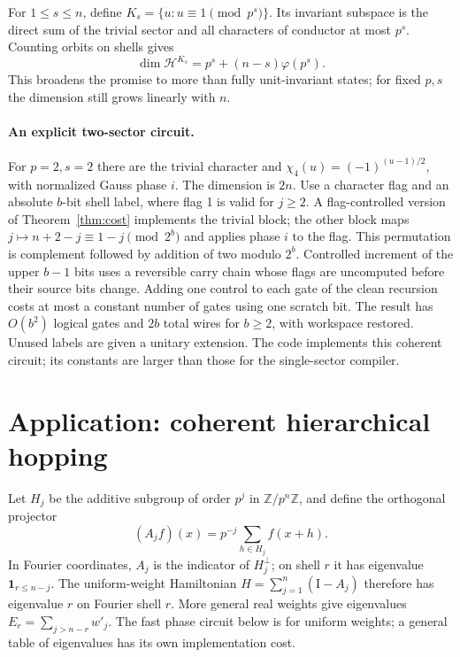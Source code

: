 \documentclass[11pt]{article}
\newcommand{\Z}{\mathbb Z}
\newcommand{\id}{\mathrm{I}}
\begin{document}
For $1\le s\le n$, define $K_s=\{u:u\equiv1\pmod {p^s}\}$. Its invariant subspace is the direct sum of the trivial sector and all characters of conductor at most $p^s$. Counting orbits on shells gives
\begin{equation}
 \dim\mathcal H^{K_s}=p^s+(n-s)\varphi(p^s).
\end{equation}
This broadens the promise to more than fully unit-invariant states; for fixed $p,s$ the dimension still grows linearly with $n$.

\paragraph{An explicit two-sector circuit.} For $p=2,s=2$ there are the trivial character and $\chi_4(u)=(-1)^{(u-1)/2}$, with normalized Gauss phase $i$. The dimension is $2n$. Use a character flag and an absolute $b$-bit shell label, where flag 1 is valid for $j\ge2$. A flag-controlled version of Theorem~\ref{thm:cost} implements the trivial block; the other block maps $j\mapsto n+2-j\equiv 1-j\pmod{2^b}$ and applies phase $i$ to the flag. This permutation is complement followed by addition of two modulo $2^b$. Controlled increment of the upper $b-1$ bits uses a reversible carry chain whose flags are uncomputed before their source bits change. Adding one control to each gate of the clean recursion costs at most a constant number of gates using one scratch bit. The result has $O(b^2)$ logical gates and $2b$ total wires for $b\ge2$, with workspace restored. Unused labels are given a unitary extension. The code implements this coherent circuit; its constants are larger than those for the single-sector compiler.

\section{Application: coherent hierarchical hopping}
Let $H_j$ be the additive subgroup of order $p^j$ in $\Z/p^n\Z$, and define the orthogonal projector
\begin{equation}
 (A_j f)(x)=p^{-j}\sum_{h\in H_j} f(x+h).
\end{equation}
In Fourier coordinates, $A_j$ is the indicator of $H_j^\perp$; on shell $r$ it has eigenvalue $\mathbf1_{r\le n-j}$. The uniform-weight Hamiltonian $H=\sum_{j=1}^n(\id-A_j)$ therefore has eigenvalue $r$ on Fourier shell $r$. More general real weights give eigenvalues $E_r=\sum_{j>n-r}w'_j$. The fast phase circuit below is for uniform weights; a general table of eigenvalues has its own implementation cost.
\end{document}
